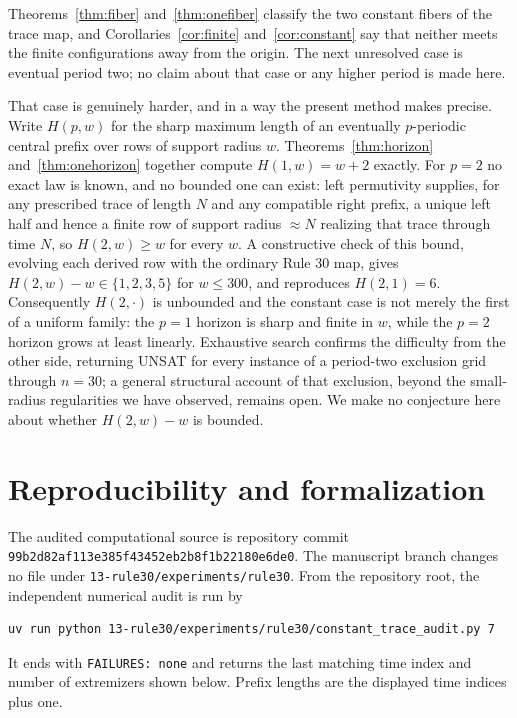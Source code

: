 \documentclass[11pt]{article}
\begin{document}
Theorems~\ref{thm:fiber} and~\ref{thm:onefiber} classify the two constant
fibers of the trace map, and Corollaries~\ref{cor:finite}
and~\ref{cor:constant} say that neither meets the finite configurations away
from the origin.  The next unresolved case is eventual period two; no claim
about that case or any higher period is made here.

That case is genuinely harder, and in a way the present method makes precise.
Write $H(p,w)$ for the sharp maximum length of an eventually $p$-periodic
central prefix over rows of support radius $w$.  Theorems~\ref{thm:horizon}
and~\ref{thm:onehorizon} together compute $H(1,w)=w+2$ exactly.  For $p=2$ no exact law is known, and no bounded
one can exist: left permutivity supplies, for any prescribed trace of length
$N$ and any compatible right prefix, a unique left half and hence a finite row
of support radius $\approx N$ realizing that trace through time $N$, so
$H(2,w)\ge w$ for every $w$.  A constructive check of this bound, evolving each
derived row with the ordinary Rule 30 map, gives $H(2,w)-w\in\{1,2,3,5\}$ for
$w\le 300$, and reproduces $H(2,1)=6$.  Consequently $H(2,\cdot)$ is unbounded
and the constant case is not merely the first of a uniform family: the
$p=1$ horizon is sharp and finite in $w$, while the $p=2$ horizon grows at
least linearly.  Exhaustive search confirms the difficulty from the other side,
returning UNSAT for every instance of a period-two exclusion grid through
$n=30$; a general structural account of that exclusion, beyond the small-radius
regularities we have observed, remains open.  We make no conjecture
here about whether $H(2,w)-w$ is bounded.

\appendix
\section{Reproducibility and formalization}\label{app:repro}

The audited computational source is repository commit
\texttt{99b2d82af113e385f43452eb2b8f1b22180e6de0}.  The manuscript branch
changes no file under \texttt{13-rule30/experiments/rule30}.  From the repository
root, the independent numerical audit is run by

\begin{verbatim}
uv run python 13-rule30/experiments/rule30/constant_trace_audit.py 7
\end{verbatim}

It ends with \texttt{FAILURES: none} and returns the last matching time index
and number of extremizers shown below.  Prefix lengths are the displayed time
indices plus one.
\end{document}
